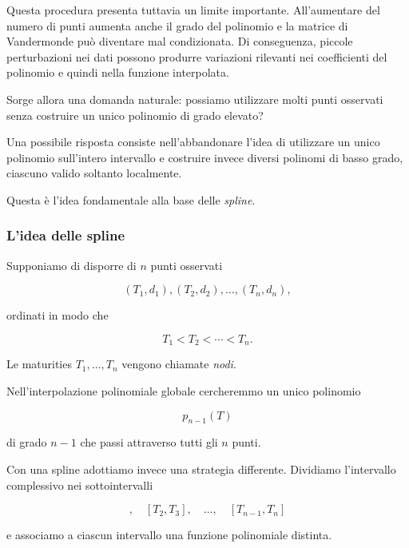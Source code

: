 Questa procedura presenta tuttavia un limite importante. All'aumentare
del numero di punti aumenta anche il grado del polinomio e la matrice
di Vandermonde può diventare mal condizionata. Di conseguenza, piccole
perturbazioni nei dati possono produrre variazioni rilevanti nei
coefficienti del polinomio e quindi nella funzione interpolata.

Sorge allora una domanda naturale: possiamo utilizzare molti punti
osservati senza costruire un unico polinomio di grado elevato?

Una possibile risposta consiste nell'abbandonare l'idea di utilizzare
un unico polinomio sull'intero intervallo e costruire invece diversi
polinomi di basso grado, ciascuno valido soltanto localmente.

Questa è l'idea fondamentale alla base delle \emph{spline}.


\subsubsection{L'idea delle spline}

Supponiamo di disporre di $n$ punti osservati

\begin{equation*}
    (T_1,d_1),(T_2,d_2),\ldots,(T_n,d_n),
\end{equation*}

ordinati in modo che

\begin{equation*}
    T_1<T_2<\cdots<T_n.
\end{equation*}

Le maturities $T_1,\ldots,T_n$ vengono chiamate \emph{nodi}.

Nell'interpolazione polinomiale globale cercheremmo un unico
polinomio

\begin{equation*}
    p_{n-1}(T)
\end{equation*}

di grado $n-1$ che passi attraverso tutti gli $n$ punti.

Con una spline adottiamo invece una strategia differente. Dividiamo
l'intervallo complessivo nei sottointervalli

\begin{equation*}
[T_1,T_2],\quad
[T_2,T_3],\quad
\ldots,\quad
[T_{n-1},T_n]
\end{equation*}

e associamo a ciascun intervallo una funzione polinomiale distinta.

